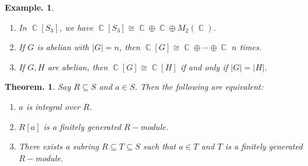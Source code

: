\documentclass[11pt, a4paper]{memoir}
\DeclareMathOperator{\C}{{\mathbb{C}}}
\theoremstyle{change}
\newtheorem{theorem}{Theorem.}[section]
\theoremstyle{plain}
\theoremstyle{nonumberplain}
\newtheorem{example}{Example.}
\numberwithin{equation}{section}
\begin{document}
\begin{example}
    \begin{enumerate}[nl,r]
        \item In $\C[S_3]$, we have $\C[S_3]\cong \C\oplus\C\oplus M_2(\C)$.
        \item If $G$ is abelian with $|G|=n$, then $\C[G]\cong \C\oplus\cdots\oplus\C$ $n$ times.
        \item If $G,H$ are abelian, then $\C[G]\cong\C[H]$ if and only if $|G|=|H|$.
    \end{enumerate}
\end{example}
\begin{theorem}
    Say $R\subseteq S$ and $a\in S$.
    Then the following are equivalent:
    \begin{enumerate}[nl]
        \item $a$ is integral over $R$.
        \item $R[a]$ is a finitely generated $R-$module.
        \item There exists a subring $R\subseteq T\subseteq S$ such that $a\in T$ and $T$ is a finitely generated $R-$module.
    \end{enumerate}
\end{theorem}
\end{document}
